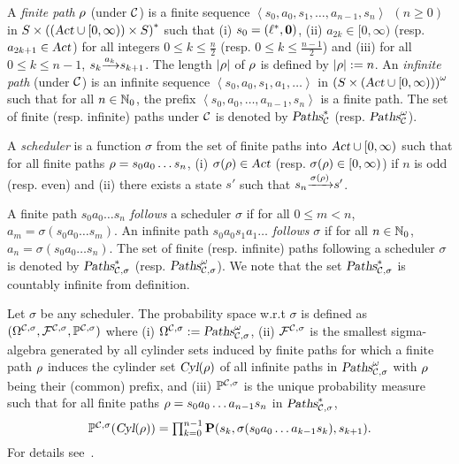 \smallskip {}
A \emph{finite path} $\rho$ (under $\mathcal{C}$) is a finite sequence
$
\left\langle s_0,a_0,s_1,\dots,a_{n-1},s_n\right\rangle~~(n\ge 0)
$
in
$S\times{\left((\mbox{\sl Act}\cup[0,\infty))\times S\right)}^*$
such that (i) $s_0=(\ell^*,\mathbf{0})$,
(ii) $a_{2k}\in [0,\infty)$ (resp. $a_{2k+1}\in \mbox{\sl Act}$) for all integers $0\le k\le \frac{n}{2}$ (resp. $0\le k\le \frac{n-1}{2}$) and
(iii) for all $0\le k\le n-1$, ${s_k}{\xrightarrow{a_k}}{s_{k+1}}$.
The length $\left| \rho \right|$ of $\rho$ is defined by $\left| \rho \right|:=n$.
An \emph{infinite path} (under $\mathcal{C}$) is an infinite sequence
$
\left\langle s_0,a_0,s_1,a_1,\dots\right\rangle
$
in
${\left(S\times(\mbox{\sl Act}\cup[0,\infty))\right)}^\omega$
such that for all $n\in\mathbb{N}_0$, the prefix $\left\langle s_0,a_0,\dots,a_{n-1},s_n\right\rangle$ is a finite path.
The set of finite (resp. infinite) paths  under $\mathcal{C}$ is denoted by $\mbox{\sl Paths}^*_{\mathcal{C}}$ (resp. $\mbox{\sl Paths}^\omega_{\mathcal{C}}$).

\smallskip {}
A \emph{scheduler} is a function $\sigma$ from the set of finite paths into $\mbox{\sl Act}\cup [0,\infty)$ such that for all finite paths $\rho=s_0a_0\dots s_n$,
(i) $\sigma(\rho)\in\mbox{\sl Act}$ (resp. $\sigma(\rho)\in  [0,\infty)$) if $n$ is odd (resp. even) and (ii)
there exists a state $s'$ such that ${s_n}{\xrightarrow{\sigma(\rho)}}{s'}$.

\smallskip{}
A finite path $s_0a_0\dots s_n$ \emph{follows} a scheduler $\sigma$ if for all $0\le m< n$, $a_m=\sigma\left(s_0a_0\dots s_m\right)$.
An infinite path $s_0a_0s_1a_1\dots$ \emph{follows} $\sigma$ if for all $n\in\mathbb{N}_0$, $a_n=\sigma\left(s_0a_0\dots s_n\right)$.
The set of finite (resp. infinite) paths following a scheduler $\sigma$ is denoted by $\mbox{\sl Paths}^*_{\mathcal{C},\sigma}$ (resp. $\mbox{\sl Paths}^\omega_{\mathcal{C},\sigma}$).
We note that the set $\mbox{\sl Paths}^*_{\mathcal{C},\sigma}$ is countably infinite from definition.

\smallskip {}
Let $\sigma$ be any scheduler.
The probability space w.r.t $\sigma$ is defined as
$
(\Omega^{\mathcal{C},\sigma}, \mathcal{F}^{\mathcal{C},\sigma}, \mathbb{P}^{\mathcal{C},\sigma})
$
where (i) $\Omega^{\mathcal{C},\sigma}:=\mbox{\sl Paths}^\omega_{\mathcal{C},\sigma}$, (ii) $\mathcal{F}^{\mathcal{C},\sigma}$ is the smallest sigma-algebra generated by all cylinder sets induced by finite paths for which
a finite path $\rho$ induces the cylinder set $\mbox{\sl Cyl}(\rho)$ of all infinite paths in $\mbox{\sl Paths}^\omega_{\mathcal{C},\sigma}$ with $\rho$ being their (common) prefix,
and (iii) $\mathbb{P}^{\mathcal{C},\sigma}$ is the unique probability measure such that for all finite paths $\rho=s_0a_0\dots a_{n-1}s_n$ in $\mbox{\sl Paths}^*_{\mathcal{C},\sigma}$,
\vspace{-0.8em}
\[
\textstyle{\mathbb{P}^{\mathcal{C},\sigma}(\mbox{\sl Cyl}(\rho))=\prod_{k=0}^{n-1} \mathbf{P}(s_k, \sigma(s_0a_0\dots a_{k-1}s_k), s_{k+1}).}
\]
\vspace{-0.8em}
For details see~\cite{DBLP:journals/tcs/KwiatkowskaNSS02}.

